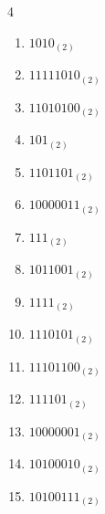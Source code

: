 \begin{multicols}{4}
\begin{enumerate}
        \phantom{$=8$}

  \item $1010_{(2)}$

        \phantom{$=10$}

\columnbreak %

  \item $11111010_{(2)}$

        \phantom{$=250$}

  \item $11010100_{(2)}$

        \phantom{$=212$}

  \item $101_{(2)}$

        \phantom{$=5$}

  \item $1101101_{(2)}$

        \phantom{$=109$}

  \item $10000011_{(2)}$

        \phantom{$=131$}

  \item $111_{(2)}$

        \phantom{$=7$}

  \item $1011001_{(2)}$

        \phantom{$=89$}

  \item $1111_{(2)}$

        \phantom{$=15$}

  \item $1110101_{(2)}$

        \phantom{$=117$}

  \item $11101100_{(2)}$

        \phantom{$=236$}

  \item $111101_{(2)}$

        \phantom{$=61$}

  \item $10000001_{(2)}$

        \phantom{$=129$}

  \item $10100010_{(2)}$

        \phantom{$=162$}

  \item $10100111_{(2)}$


\end{enumerate}
\end{multicols}
